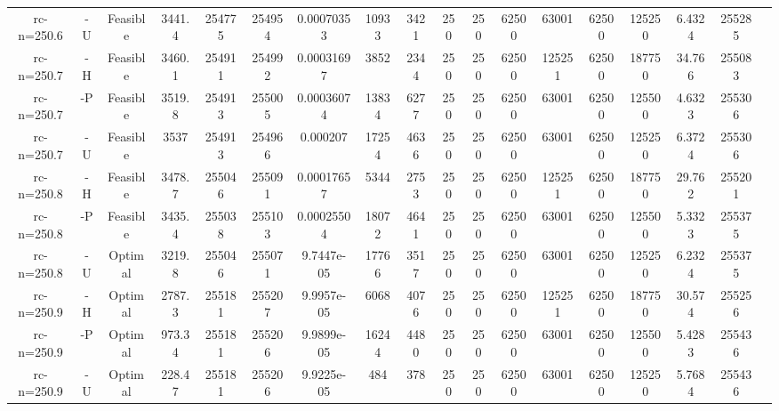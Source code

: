 \documentclass[landscape, a4paper]{article}
\begin{document}
\begin{center}
\begin{tabular}{@{}cccccccccccccccccc@{}}
rc-n=250.6 & -U & Feasible & 3441.4 & 254775 & 254954 & 0.00070353 & 10933 & 3421 & 250 & 250 & 62500 & 63001 & 62500 & 125250 & 6.4324 & 255285 & \\
rc-n=250.7 & -H & Feasible & 3460.1 & 254911 & 254992 & 0.00031697 & 3852 & 2344 & 250 & 250 & 62500 & 125251 & 62500 & 187750 & 34.766 & 255083 & \\
rc-n=250.7 & -P & Feasible & 3519.8 & 254913 & 255005 & 0.00036074 & 13834 & 6277 & 250 & 250 & 62500 & 63001 & 62500 & 125500 & 4.6323 & 255306 & \\
rc-n=250.7 & -U & Feasible & 3537 & 254913 & 254966 & 0.000207 & 17254 & 4636 & 250 & 250 & 62500 & 63001 & 62500 & 125250 & 6.3724 & 255306 & \\
rc-n=250.8 & -H & Feasible & 3478.7 & 255046 & 255091 & 0.00017657 & 5344 & 2753 & 250 & 250 & 62500 & 125251 & 62500 & 187750 & 29.762 & 255201 & \\
rc-n=250.8 & -P & Feasible & 3435.4 & 255038 & 255103 & 0.00025504 & 18072 & 4641 & 250 & 250 & 62500 & 63001 & 62500 & 125500 & 5.3323 & 255375 & \\
rc-n=250.8 & -U & Optimal & 3219.8 & 255046 & 255071 & 9.7447e-05 & 17766 & 3517 & 250 & 250 & 62500 & 63001 & 62500 & 125250 & 6.2324 & 255375 & \\
rc-n=250.9 & -H & Optimal & 2787.3 & 255181 & 255207 & 9.9957e-05 & 6068 & 4076 & 250 & 250 & 62500 & 125251 & 62500 & 187750 & 30.574 & 255256 & \\
rc-n=250.9 & -P & Optimal & 973.34 & 255181 & 255206 & 9.9899e-05 & 16244 & 4480 & 250 & 250 & 62500 & 63001 & 62500 & 125500 & 5.4283 & 255436 & \\
rc-n=250.9 & -U & Optimal & 228.47 & 255181 & 255206 & 9.9225e-05 & 484 & 378 & 250 & 250 & 62500 & 63001 & 62500 & 125250 & 5.7684 & 255436 & \\
\end{tabular}
\end{center}
\end{document}

